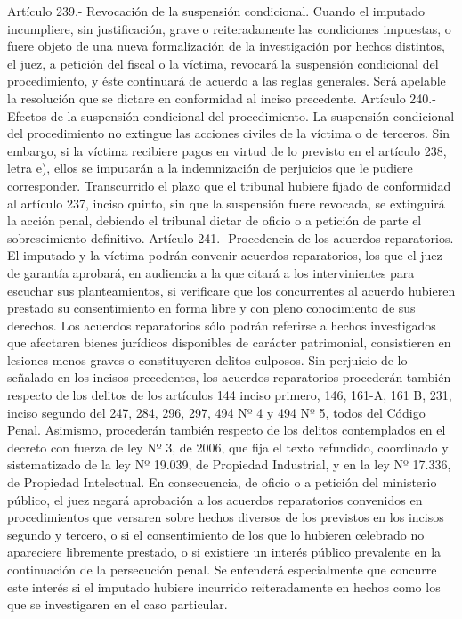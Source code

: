     Artículo 239.- Revocación de la suspensión condicional. Cuando el imputado incumpliere, sin justificación, grave o reiteradamente las condiciones impuestas, o fuere objeto de una nueva formalización de la investigación por hechos distintos, el juez, a petición del fiscal o la víctima, revocará la suspensión condicional del procedimiento, y éste continuará de acuerdo a las reglas generales.
    Será apelable la resolución que se dictare en conformidad al inciso precedente.
    Artículo 240.- Efectos de la suspensión condicional del procedimiento. La suspensión condicional del procedimiento no extingue las acciones civiles de la víctima o de terceros. Sin embargo, si la víctima recibiere pagos en virtud de lo previsto en el artículo 238, letra e), ellos se imputarán a la indemnización de perjuicios que le pudiere corresponder.
    Transcurrido el plazo que el tribunal hubiere fijado de conformidad al artículo 237, inciso quinto, sin que la suspensión fuere revocada, se extinguirá la acción penal, debiendo el tribunal dictar de oficio o a petición de parte el sobreseimiento definitivo.
    Artículo 241.- Procedencia de los acuerdos reparatorios. El imputado y la víctima podrán convenir acuerdos reparatorios, los que el juez de garantía aprobará, en audiencia a la que citará a los intervinientes para escuchar sus planteamientos, si verificare que los concurrentes al acuerdo hubieren prestado su consentimiento en forma libre y con pleno conocimiento de sus derechos.
    Los acuerdos reparatorios sólo podrán referirse a hechos investigados que afectaren bienes jurídicos disponibles de carácter patrimonial, consistieren en lesiones menos graves o constituyeren delitos culposos.
    Sin perjuicio de lo señalado en los incisos precedentes, los acuerdos reparatorios procederán también respecto de los delitos de los artículos 144 inciso primero, 146, 161-A, 161 B, 231, inciso segundo del 247, 284, 296, 297, 494 Nº 4 y 494 Nº 5, todos del Código Penal. Asimismo, procederán también respecto de los delitos contemplados en el decreto con fuerza de ley Nº 3, de 2006, que fija el texto refundido, coordinado y sistematizado de la ley Nº 19.039, de Propiedad Industrial, y en la ley Nº 17.336, de Propiedad Intelectual.
    En consecuencia, de oficio o a petición del ministerio público, el juez negará aprobación a los acuerdos reparatorios convenidos en procedimientos que versaren sobre hechos diversos de los previstos en los incisos segundo y tercero, o si el consentimiento de los que lo hubieren celebrado no apareciere libremente prestado, o si existiere un interés público prevalente en la continuación de la persecución penal. Se entenderá especialmente que concurre este interés si el imputado hubiere incurrido reiteradamente en hechos como los que se investigaren en el caso particular.

